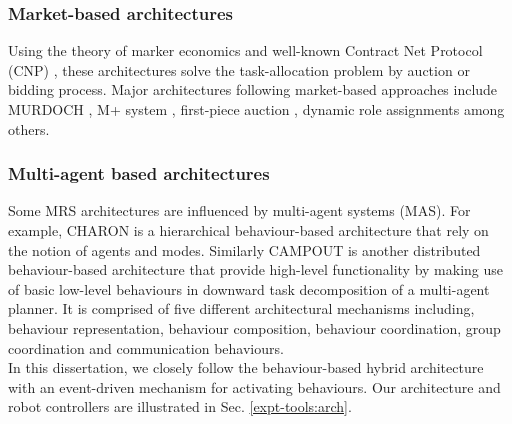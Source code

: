 \subsubsection*{Market-based architectures}
Using the theory of marker economics and well-known Contract Net Protocol (CNP) \cite{Davis1988+}, these architectures solve the task-allocation problem by auction or bidding process. Major architectures following market-based approaches include MURDOCH \cite{Gerkey+2002}, M+ system \cite{Botelho+1999}, first-piece auction \cite{Zlot+2002}, dynamic role assignments \cite{Chaimowicz2002} among others.
\subsubsection*{Multi-agent based architectures}
Some MRS architectures are influenced by multi-agent systems (MAS). For example, CHARON is a hierarchical behaviour-based architecture that rely on the notion of agents and modes. Similarly CAMPOUT is another distributed behaviour-based architecture that provide high-level functionality by making use of basic low-level behaviours in downward task decomposition of a multi-agent planner. It is comprised of five different architectural mechanisms including, behaviour representation, behaviour composition, behaviour coordination, group coordination and communication behaviours.\\
In this dissertation, we closely follow the behaviour-based hybrid architecture with an event-driven mechanism for activating behaviours. Our architecture and robot controllers are illustrated in Sec. \ref{expt-tools:arch}.
